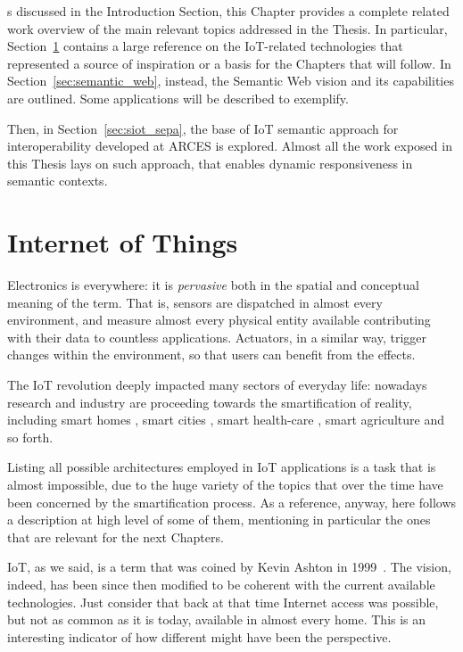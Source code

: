 s discussed in the Introduction Section, this Chapter provides a complete related work overview of the main relevant topics addressed in the Thesis. In particular, Section~\ref{sec:iot} contains a large reference on the IoT-related technologies that represented a source of inspiration or a basis for the Chapters that will follow. In Section~\ref{sec:semantic_web}, instead, the Semantic Web vision and its capabilities are outlined. Some applications will be described to exemplify.

Then, in Section~\ref{sec:siot_sepa}, the base of IoT semantic approach for interoperability developed at ARCES is explored. Almost all the work exposed in this Thesis lays on such approach, that enables dynamic responsiveness in semantic contexts.

\section{Internet of Things}
\label{sec:iot}

Electronics is everywhere: it is \textit{pervasive} \cite{saha2003pervasive} both in the spatial and conceptual meaning of the term. That is, sensors are dispatched in almost every environment, and measure almost every physical entity available contributing with their data to countless applications. Actuators, in a similar way, trigger changes within the environment, so that users can benefit from the effects. 

The IoT revolution \cite{gubbi2013internet, atzori2010internet} deeply impacted many sectors of everyday life: nowadays research and industry are proceeding towards the smartification of reality, including smart homes \cite{stojkoska2017review}, smart cities \cite{zanella2014internet, betis2018ieee}, smart health-care \cite{solanas2014smart, catarinucci2015iot, borelli2019habitat}, smart agriculture \cite{gondchawar2016iot, patil2016model} and so forth.

Listing all possible architectures employed in IoT applications is a task that is almost impossible, due to the huge variety of the topics that over the time have been concerned by the smartification process. As a reference, anyway, here follows a description at high level of some of them, mentioning in particular the ones that are relevant for the next Chapters. 

IoT, as we said, is a term that was coined by Kevin Ashton in 1999~\cite{ashton2009internet}. The vision, indeed, has been since then modified to be coherent with the current available technologies. Just consider that back at that time Internet access was possible, but not as common as it is today, available in almost every home. This is an interesting indicator of how different might have been the perspective.

